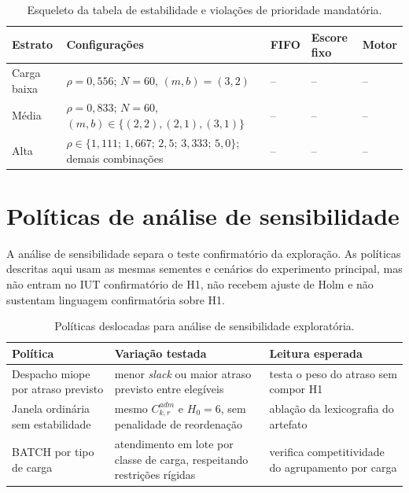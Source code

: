 \documentclass[
  12pt,
  oneside,
  a4paper,
  sumario=tradicional,
  brazil
]{abntex2}
\begin{document}
\begin{apendicesenv}
\begin{table}[H]
\centering
\scriptsize
\setlength{\tabcolsep}{4pt}
\renewcommand{\arraystretch}{1.16}
\begin{tabularx}{\textwidth}{@{}P{0.18\textwidth}P{0.35\textwidth}C{0.13\textwidth}C{0.15\textwidth}Y@{}}
\toprule
{}
\textbf{Estrato} & \textbf{Configura\c{c}\~oes} & \textbf{FIFO} & \textbf{Escore fixo} & \textbf{Motor} \\
\midrule
Carga baixa & $\rho=0{,}556$; $N=60$, $(m,b)=(3,2)$ & -- & -- & -- \\
M\'edia & $\rho=0{,}833$; $N=60$, $(m,b)\in\{(2,2),(2,1),(3,1)\}$ & -- & -- & -- \\
Alta & $\rho \in \{1{,}111;\,1{,}667;\,2{,}5;\,3{,}333;\,5{,}0\}$; demais combina\c{c}\~oes & -- & -- & -- \\
\bottomrule
\end{tabularx}
\caption[Estabilidade e prioridade mandat\'oria]{Esqueleto da tabela de estabilidade e viola\c{c}\~oes de prioridade mandat\'oria.}
\label{tab:estabilidade-prioridade-prevista}
\end{table}

\chapter{Pol\'iticas de an\'alise de sensibilidade}\label{apx:politicas-secundarias}

A an\'alise de sensibilidade separa o teste confirmat\'orio da explora\c{c}\~ao. As pol\'iticas descritas aqui usam as mesmas sementes e cen\'arios do experimento principal, mas n\~ao entram no IUT confirmat\'orio de H1, n\~ao recebem ajuste de Holm e n\~ao sustentam linguagem confirmat\'oria sobre H1.

\begin{table}[H]
\centering
\small
\setlength{\tabcolsep}{5pt}
\renewcommand{\arraystretch}{1.14}
\begin{tabularx}{\textwidth}{@{}P{0.28\textwidth}P{0.36\textwidth}Y@{}}
\toprule
{}
\textbf{Pol\'itica} & \textbf{Varia\c{c}\~ao testada} & \textbf{Leitura esperada} \\
\midrule
Despacho miope por atraso previsto & menor \textit{slack} ou maior atraso previsto entre eleg\'iveis & testa o peso do atraso sem compor H1 \\
\addlinespace
Janela ordin\'aria sem estabilidade & mesmo $C^{adm}_{k,r}$ e $H_0=6$, sem penalidade de reordena\c{c}\~ao & abla\c{c}\~ao da lexicografia do artefato \\
\addlinespace
BATCH por tipo de carga & atendimento em lote por classe de carga, respeitando restri\c{c}\~oes r\'igidas & verifica competitividade do agrupamento por carga \\
\bottomrule
\end{tabularx}
\caption[Pol\'iticas em an\'alise de sensibilidade]{Pol\'iticas deslocadas para an\'alise de sensibilidade explorat\'oria.}
\label{tab:politicas-sensibilidade}
\end{table}


\end{apendicesenv}
\end{document}
